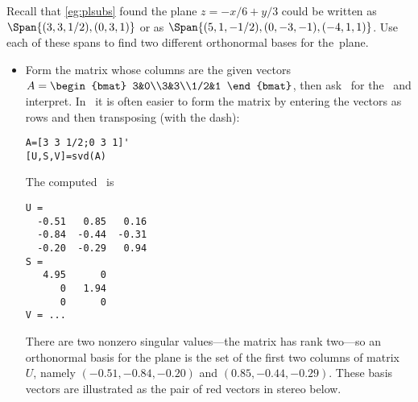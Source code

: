 \begin{example} \label{eg:orthospan}
Recall that \cref{eg:plsubs} found the plane \(z=-x/6+y/3\) could be written as \(\Span\{(3,3,1/2),(0,3,1)\}\) or as \(\Span\{(5,1,-1/2),(0,-3,-1),(-4,1,1)\}\).
Use each of these spans to find two different orthonormal bases for the~plane.
\begin{solution} 
\begin{itemize}
\item Form the matrix whose columns are the given vectors
\(A=\begin{bmat} 3&0\\3&3\\1/2&1 \end{bmat}\),
then ask \script\ for the \svd\ and interpret.
In \script\ it is often easier to form the matrix by entering the vectors as rows and then transposing (with the dash):
\begin{verbatim}
A=[3 3 1/2;0 3 1]'
[U,S,V]=svd(A)
\end{verbatim}
\setbox\ajrqrbox\hbox{}%
\marginajrbox%
The computed \svd\ is \twodp
\begin{verbatim}
U =
  -0.51   0.85   0.16
  -0.84  -0.44  -0.31
  -0.20  -0.29   0.94
S =
   4.95      0
      0   1.94
      0      0
V = ...
\end{verbatim}
There are two nonzero singular values---the matrix has rank two---so an orthonormal basis for the plane is the set of the first two columns of matrix~\(U\), namely  \((-0.51,-0.84,-0.20)\) and \((0.85,-0.44,-0.29)\).
These basis vectors are illustrated as the pair of red vectors in stereo below.
\begin{center}
 {}%
\end{center}


\end{itemize}
\end{solution}
\end{example}
